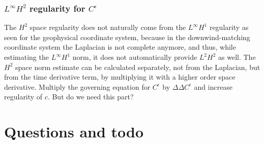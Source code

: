 \documentclass[11pt]{article}
\begin{document}
    \subsubsection{$L^\infty H^2$ regularity for $C^\epsilon$}
    
    The $H^2$ space regularity does not naturally come from the $L^\infty H^1$ regularity as seen for the geophysical coordinate system, because in the downwind-matching coordinate system the Laplacian is not complete anymore, and thus, while estimating the $L^\infty H^1$ norm, it does not automatically provide $L^2 H^2$ as well. The $H^2$ space norm estimate can be calculated separately, not from the Laplacian, but from the time derivative term, by multiplying it with a higher order space derivative.
    Multiply the governing equation for $C^\epsilon$ by $\Delta \Delta C^\epsilon$ and increase regularity of $c.$ But do we need this part?


\section{Questions and todo}
\end{document}
